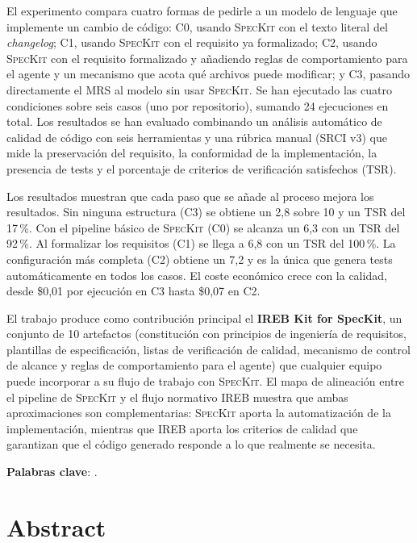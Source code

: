 \documentclass[minitoc, hidelinks, headlogo, framedcover]{tfeEPCC}
\begin{document}
El experimento compara cuatro formas de pedirle a un modelo de lenguaje que implemente un cambio de c\'odigo: C0, usando \textsc{SpecKit} con el texto literal del \emph{changelog}; C1, usando \textsc{SpecKit} con el requisito ya formalizado; C2, usando \textsc{SpecKit} con el requisito formalizado y a\~nadiendo reglas de comportamiento para el agente y un mecanismo que acota qu\'e archivos puede modificar; y C3, pasando directamente el MRS al modelo sin usar \textsc{SpecKit}. Se han ejecutado las cuatro condiciones sobre seis casos (uno por repositorio), sumando 24 ejecuciones en total. Los resultados se han evaluado combinando un an\'alisis autom\'atico de calidad de c\'odigo con seis herramientas y una r\'ubrica manual (SRCI v3) que mide la preservaci\'on del requisito, la conformidad de la implementaci\'on, la presencia de tests y el porcentaje de criterios de verificaci\'on satisfechos (TSR).

Los resultados muestran que cada paso que se a\~nade al proceso mejora los resultados. Sin ninguna estructura (C3) se obtiene un 2{,}8 sobre 10 y un TSR del 17\,\%. Con el pipeline b\'asico de \textsc{SpecKit} (C0) se alcanza un 6{,}3 con un TSR del 92\,\%. Al formalizar los requisitos (C1) se llega a 6{,}8 con un TSR del 100\,\%. La configuraci\'on m\'as completa (C2) obtiene un 7{,}2 y es la \'unica que genera tests autom\'aticamente en todos los casos. El coste econ\'omico crece con la calidad, desde \$0{,}01 por ejecuci\'on en C3 hasta \$0{,}07 en C2.

El trabajo produce como contribuci\'on principal el \textbf{IREB Kit for SpecKit}, un conjunto de 10 artefactos (constituci\'on con principios de ingenier\'ia de requisitos, plantillas de especificaci\'on, listas de verificaci\'on de calidad, mecanismo de control de alcance y reglas de comportamiento para el agente) que cualquier equipo puede incorporar a su flujo de trabajo con \textsc{SpecKit}. El mapa de alineaci\'on entre el pipeline de \textsc{SpecKit} y el flujo normativo IREB muestra que ambas aproximaciones son complementarias: \textsc{SpecKit} aporta la automatizaci\'on de la implementaci\'on, mientras que IREB aporta los criterios de calidad que garantizan que el c\'odigo generado responde a lo que realmente se necesita.

\noindent\textbf{Palabras clave}: \printkeywords.

\chapter*{Abstract}
\end{document}
